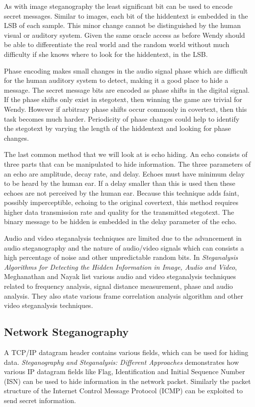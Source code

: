 \documentclass[11pt]{article}
\begin{document}
As with image steganography the least significant bit can be used to
encode secret messages. Similar to images, each bit of the hiddentext
is embedded in the LSB of each sample. This minor change cannot be
distinguished by the human visual or auditory system. Given the same
oracle access as before Wendy should be able to differentiate the real
world and the random world without much difficulty if she knows where
to look for the hiddentext, in the LSB.
 
Phase encoding makes small changes in the audio signal phase which are
difficult for the human auditory system to detect, making it a good
place to hide a message. The secret message bits are encoded as phase
shifts in the digital signal\cite{Das}. If the phase shifts only exist in
stegotext, then winning the game are trivial for Wendy. However if
arbitrary phase shifts occur commonly in covertext, then this task
becomes much harder. Periodicity of phase changes could help to
identify the stegotext by varying the length of the hiddentext and
looking for phase changes.

The last common method that we will look at is echo hiding. An echo
consists of three parts that can be manipulated to hide information.
The three parameters of an echo are amplitude, decay rate, and delay.
Echoes must have minimum delay to be heard by the human ear. If a
delay smaller than this is used then these echoes are not perceived by
the human ear. Because this technique adds faint, possibly
imperceptible, echoing to the original covertext, this method requires
higher data transmission rate and quality for the transmitted
stegotext\cite{Meghanathan}. The binary message to be hidden is
embedded in the delay parameter of the echo.

Audio and video steganalysis techniques are limited due to the
advancement in audio steganography and the nature of audio/video
signals which can consists a high percentage of noise and other
unpredictable random bits. In \emph{Steganalysis Algorithms for
  Detecting the Hidden Information in Image, Audio and
Video}\cite{Meghanathan}, Meghanathan and Nayak list various audio and
video steganalysis techniques related to frequency analysis, signal
distance measurement, phase and audio analysis. They also state
various frame correlation analysis algorithm and other video
steganalysis techniques.

\subsection{Network Steganography}
A TCP/IP datagram header contains various fields, which can be used
for hiding data. \emph{Steganography and Steganalysis: Different
Approaches} \cite{Szczypiorski} demonstrates how various IP datagram fields
like Flag, Identification and Initial Sequence Number (ISN) can be
used to hide information in the network packet. Similarly the packet
structure of the Internet Control Message Protocol (ICMP) can be
exploited to send secret information.
\end{document}
